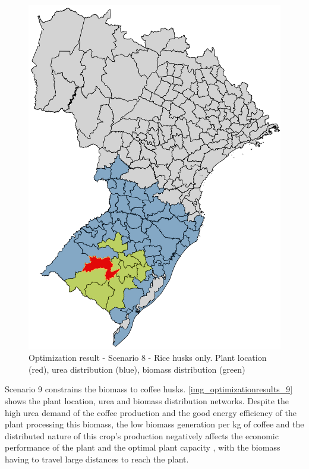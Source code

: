 \documentclass[a4paper, titlepage]{article}
\begin{document}
\begin{figure}
	\includegraphics[width=\textwidth]{img/optimization_result_8.png}
	\caption{Optimization result - Scenario 8 - Rice husks only. Plant location (red), urea distribution (blue), biomass distribution (green)}
	\label{img_optimizationresults_8}
\end{figure}

Scenario 9 constrains the biomass to coffee husks. \autoref{img_optimizationresults_9} shows the plant
location, urea and biomass distribution networks. Despite the high urea demand of the coffee production and the good
energy efficiency of the plant processing this biomass, the low biomass generation per kg of coffee and the distributed
nature of this crop's production negatively affects the economic performance of the plant and the optimal plant capacity
, with the biomass having to travel large distances to reach the plant.
\end{document}

